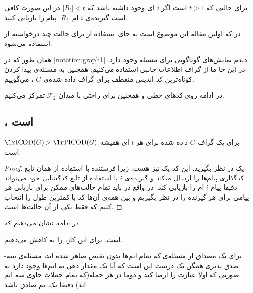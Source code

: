 \begin{note}
	برای حالتی که
	$t > 1$
	است اگر
	$i$
	ای وجود داشته باشد که
	$|R_i| < t$
	در این صورت کافی است گیرنده‌ی 
	$i$
	ام
	$|R_i|$
	پیام را بازیابی کنید.
	\cite{pliablefirstpaper}
\end{note}

\begin{note}
	در 
	\cite{pliablefirstpaper}
	که اولین مقاله این موضوع است به جای استفاده از
	\picodt
	برای حالت چند درخواسته از
	استفاده می‌شود.
\end{note}
\begin{notation}
	همان طور که در
	\autoref{notation:graph1}
	دیدم نمایش‌های گوناگوبی برای مسئله وجود دارد. در این جا ما از گراف اطلاعات جانبی استفاده می‌کنیم. همچنین به مسئله‌ی پیدا کردن کوتاه‌ترین کد اندیس منعطف برای گراف داده شده‌ی 
	$G$
	،
	\picodg
	می‌گوییم.
\end{notation}


در ادامه روی کدهای خطی و همچنین برای راحتی با میدان
$\mathcal{F}_2$
تمرکز می‌کنیم.

\subsection{
\lpicod
،
\nphard
 است
}

\begin{lemma}
برای یک گراف
$G$
داده شده برای هر
$t$
ای همیشه
 $\text{\icodg} > \text{\picodg}$
 است.
 \cite{pliablefirstpaper}
\end{lemma}
\begin{proof}
	یک 
	\icod
	در نظر بگیرید. این کد یک
	\picod
	نیز هست. زیرا فرستنده با استفاده از همان تابع کدگذاری پیام‌ها را ارسال میکند و گیرنده‌ی
	$i$
	با استفاده از تابغ کدگشایی خود می‌تواند دقیقا	 پیام
	$i$
	ام را بازیابی کند. در واقع در
	\picod
	باید تمام حالت‌های ممکن برای بازیابی هر پیامی برای هر گیرنده را در نظر بگیریم و بین همه‌ی آن‌ها کد با کمترین طول را انتخاب کنیم که 
	\icod
	فقط یکی از آن حالت‌ها است.
\end{proof}

در ادامه نشان می‌دهیم که

\nphard
است. برای این کار، 
\lpicod
 را به
کاهش می‌دهیم.

\begin{definition}
	برای یک مصداق از مسئله‌ی 
که تمام اتم‌ها بدون نقیض ضاهر شده اند، مسئله‌ی سه-صدق پذیری همگن یک درست این است که آیا یک مقدار دهی به اتم‌ها وجود دارد به صورتی که اولا عبارت را ارضا کند و دوما در هر جمله(که تمام جملات حاوی سه اتم اند) دقیقا یک اتم صادق باشد
\end{definition}

